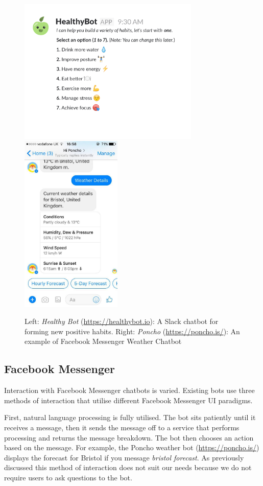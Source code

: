 \begin{figure}[H]
  \centering
  \includegraphics[width=3.4in]{../resources/existing-bots/healthy-bot.png}
  \hspace{10px}
  \includegraphics[width=1.9in]{../resources/existing-bots/poncho.jpg}
  \caption{Left: \textit{Healthy Bot} (\url{https://healthybot.io}): A Slack chatbot for forming new positive habits. Right: \textit{Poncho} (\url{https://poncho.is/}): An example of Facebook Messenger Weather Chatbot}
  \label{fig:healthy_bot_and_poncho}
\end{figure}


\subsection*{Facebook Messenger}
Interaction with Facebook Messenger chatbots is varied. Existing bots use three methods of interaction that utilise different Facebook Messenger UI paradigms.

First, natural language processing is fully utilised. The bot sits patiently until it receives a message, then it sends the message off to a service that performs processing and returns the message breakdown. The bot then chooses an action based on the message. For example, the Poncho weather bot (\url{https://poncho.is/}) displays the forecast for Bristol if you message \textit{bristol forecast}. As previously discussed this method of interaction does not suit our needs because we do not require users to ask questions to the bot.

